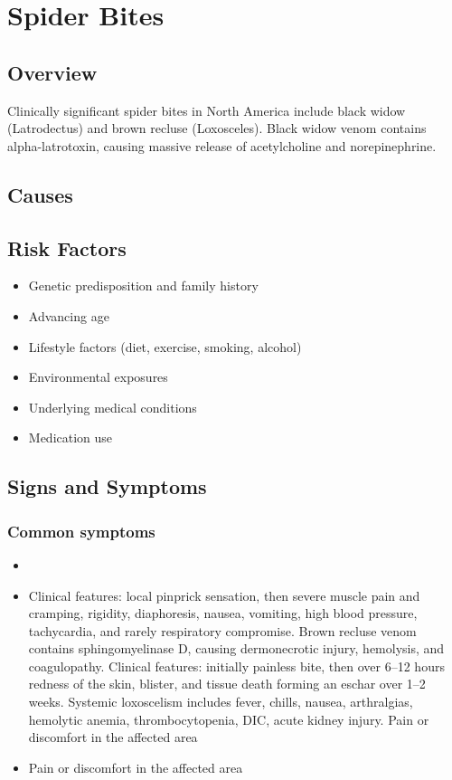 \chapter{Spider Bites}
\label{sec:Spider Bites}

\section{Overview}
Clinically significant spider bites in North America include black widow (Latrodectus) and brown recluse (Loxosceles). Black widow venom contains alpha-latrotoxin, causing massive release of acetylcholine and norepinephrine.
\section{Causes}
\section{Risk Factors}

\begin{itemize}[noitemsep]
  \item Genetic predisposition and family history
  \item Advancing age
  \item Lifestyle factors (diet, exercise, smoking, alcohol)
  \item Environmental exposures
  \item Underlying medical conditions
  \item Medication use
\end{itemize}
\section{Signs and Symptoms}

\subsection{Common symptoms}
\begin{itemize}[noitemsep]
  \item \item Clinical features: local pinprick sensation, then severe muscle pain and cramping, rigidity, diaphoresis, nausea, vomiting, high blood pressure, tachycardia, and rarely respiratory compromise. Brown recluse venom contains sphingomyelinase D, causing dermonecrotic injury, hemolysis, and coagulopathy. Clinical features: initially painless bite, then over 6--12 hours redness of the skin, blister, and tissue death forming an eschar over 1--2 weeks. Systemic loxoscelism includes fever, chills, nausea, arthralgias, hemolytic anemia, thrombocytopenia, DIC, acute kidney injury. Pain or discomfort in the affected area    \item Pain or discomfort in the affected area
  \end{itemize}

